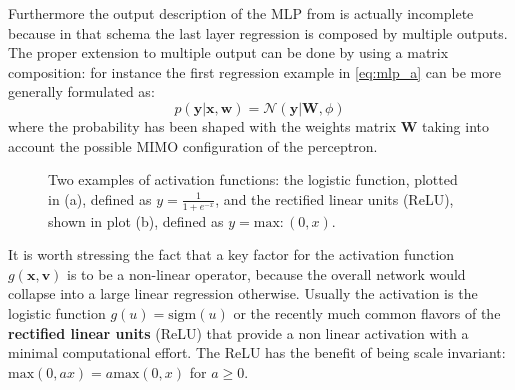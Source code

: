 Furthermore the output description of the \acs{MLP} from \Figure{\ref{fig:generic_mlp_a}} is actually incomplete because in that schema the last layer regression is composed by multiple outputs. 
The proper extension to multiple output can be done by using a matrix composition: for instance the first regression example in \eqref{eq:mlp_a} can be more generally formulated as:
\begin{equation}
    p(\bm{y}|\bm{x}, \bm{w}) = \mathcal{N}\left( \bm{y}|\bm{W},\phi \right)
\end{equation}
where the probability has been shaped with the weights matrix $\bm{W}$ taking into account the possible MIMO configuration of the perceptron.
\begin{figure}
    \centering
    \caption{Two examples of activation functions: the logistic function, plotted in (a), defined as $y=\frac{1}{1+e^{-x}}$, and the rectified linear units (ReLU), shown in plot (b), defined as ${y = \text{max}: (0,x)}$. }
    \label{fig:activations}
\end{figure}
It is worth stressing the fact that a key factor for the activation function $g(\bm{x},\bm{v})$ is to be a non-linear operator, because the overall network would collapse into a large linear regression otherwise. Usually the activation is the logistic function $g(u) = \text{sigm}(u)$ or the recently much common flavors of the \textbf{rectified linear units} (ReLU) that provide a non linear activation with a minimal computational effort. The ReLU has the benefit of being scale invariant: $\textrm{max}(0,ax) = a\textrm{max}(0,x)$ for $ a \geq 0 $.
